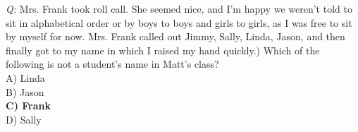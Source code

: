 \begin{framed}
\begin{flushleft}
{\em Q:} Mrs. Frank took roll call. She seemed nice, and I'm happy we weren't told to sit in alphabetical order or by boys to boys and girls to girls, as I was free to sit by myself for now. Mrs. Frank called out Jimmy, Sally, Linda, Jason, and then finally got to my name in which I raised my hand quickly.\newline{}) Which of the following is not a student's name in Matt's class?\\
A) Linda\\
B) Jason\\
\textbf{C) Frank}\\
D) Sally
\end{flushleft}
\end{framed}